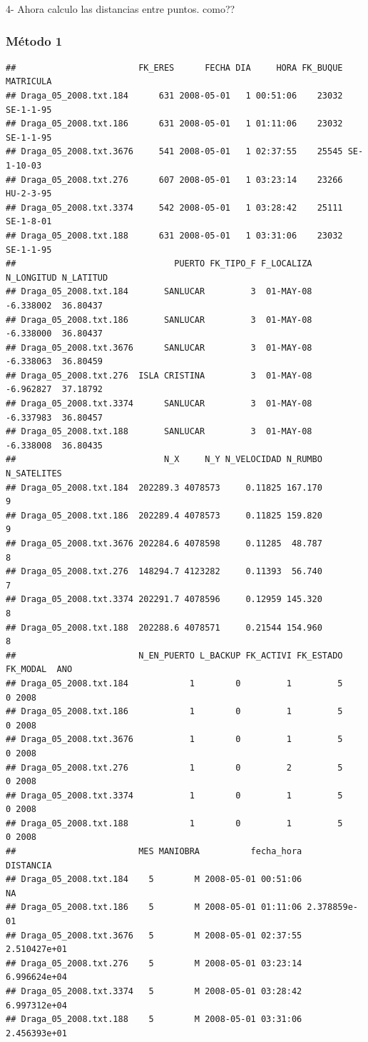 \documentclass[
]{article}
\begin{document}
4- Ahora calculo las distancias entre puntos. como??

\hypertarget{muxe9todo-1}{%
\subsubsection{Método 1}\label{muxe9todo-1}}

\begin{verbatim}
##                        FK_ERES      FECHA DIA     HORA FK_BUQUE  MATRICULA
## Draga_05_2008.txt.184      631 2008-05-01   1 00:51:06    23032  SE-1-1-95
## Draga_05_2008.txt.186      631 2008-05-01   1 01:11:06    23032  SE-1-1-95
## Draga_05_2008.txt.3676     541 2008-05-01   1 02:37:55    25545 SE-1-10-03
## Draga_05_2008.txt.276      607 2008-05-01   1 03:23:14    23266  HU-2-3-95
## Draga_05_2008.txt.3374     542 2008-05-01   1 03:28:42    25111  SE-1-8-01
## Draga_05_2008.txt.188      631 2008-05-01   1 03:31:06    23032  SE-1-1-95
##                               PUERTO FK_TIPO_F F_LOCALIZA N_LONGITUD N_LATITUD
## Draga_05_2008.txt.184       SANLUCAR         3  01-MAY-08  -6.338002  36.80437
## Draga_05_2008.txt.186       SANLUCAR         3  01-MAY-08  -6.338000  36.80437
## Draga_05_2008.txt.3676      SANLUCAR         3  01-MAY-08  -6.338063  36.80459
## Draga_05_2008.txt.276  ISLA CRISTINA         3  01-MAY-08  -6.962827  37.18792
## Draga_05_2008.txt.3374      SANLUCAR         3  01-MAY-08  -6.337983  36.80457
## Draga_05_2008.txt.188       SANLUCAR         3  01-MAY-08  -6.338008  36.80435
##                             N_X     N_Y N_VELOCIDAD N_RUMBO N_SATELITES
## Draga_05_2008.txt.184  202289.3 4078573     0.11825 167.170           9
## Draga_05_2008.txt.186  202289.4 4078573     0.11825 159.820           9
## Draga_05_2008.txt.3676 202284.6 4078598     0.11285  48.787           8
## Draga_05_2008.txt.276  148294.7 4123282     0.11393  56.740           7
## Draga_05_2008.txt.3374 202291.7 4078596     0.12959 145.320           8
## Draga_05_2008.txt.188  202288.6 4078571     0.21544 154.960           8
##                        N_EN_PUERTO L_BACKUP FK_ACTIVI FK_ESTADO FK_MODAL  ANO
## Draga_05_2008.txt.184            1        0         1         5        0 2008
## Draga_05_2008.txt.186            1        0         1         5        0 2008
## Draga_05_2008.txt.3676           1        0         1         5        0 2008
## Draga_05_2008.txt.276            1        0         2         5        0 2008
## Draga_05_2008.txt.3374           1        0         1         5        0 2008
## Draga_05_2008.txt.188            1        0         1         5        0 2008
##                        MES MANIOBRA          fecha_hora    DISTANCIA
## Draga_05_2008.txt.184    5        M 2008-05-01 00:51:06           NA
## Draga_05_2008.txt.186    5        M 2008-05-01 01:11:06 2.378859e-01
## Draga_05_2008.txt.3676   5        M 2008-05-01 02:37:55 2.510427e+01
## Draga_05_2008.txt.276    5        M 2008-05-01 03:23:14 6.996624e+04
## Draga_05_2008.txt.3374   5        M 2008-05-01 03:28:42 6.997312e+04
## Draga_05_2008.txt.188    5        M 2008-05-01 03:31:06 2.456393e+01
\end{verbatim}
\end{document}
